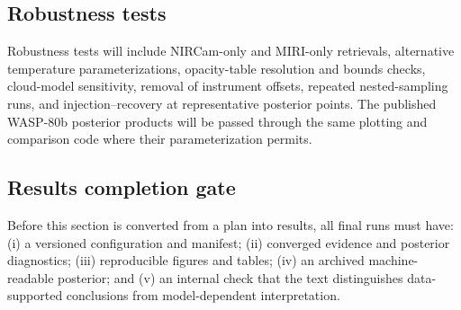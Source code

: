 \subsection{Robustness tests}

Robustness tests will include NIRCam-only and MIRI-only retrievals, alternative
temperature parameterizations, opacity-table resolution and bounds checks,
cloud-model sensitivity, removal of instrument offsets, repeated nested-sampling
runs, and injection--recovery at representative posterior points. The
published WASP-80b posterior products will be passed through the same plotting
and comparison code where their parameterization permits.

\subsection{Results completion gate}

Before this section is converted from a plan into results, all final runs must
have: (i) a versioned configuration and manifest; (ii) converged evidence and
posterior diagnostics; (iii) reproducible figures and tables; (iv) an archived
machine-readable posterior; and (v) an internal check that the text distinguishes
data-supported conclusions from model-dependent interpretation.


